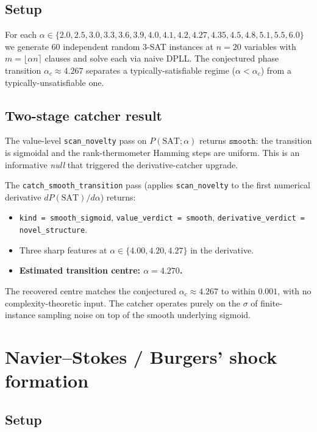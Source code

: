 \documentclass[11pt,letterpaper]{article}
\begin{document}
\subsection{Setup}

For each $\alpha \in \{2.0, 2.5, 3.0, 3.3, 3.6, 3.9, 4.0, 4.1, 4.2, 4.27, 4.35, 4.5, 4.8, 5.1, 5.5, 6.0\}$ we generate 60 independent random 3-SAT instances at $n=20$ variables with $m = \lfloor \alpha n \rceil$ clauses and solve each via naive DPLL. The conjectured phase transition $\alpha_c \approx 4.267$ \cite{satthreshold} separates a typically-satisfiable regime ($\alpha < \alpha_c$) from a typically-unsatisfiable one.

\subsection{Two-stage catcher result}

The value-level \texttt{scan\_novelty} pass on $P(\mathrm{SAT}; \alpha)$ returns $\mathtt{smooth}$: the transition is sigmoidal and the rank-thermometer Hamming steps are uniform. This is an informative \emph{null} that triggered the derivative-catcher upgrade.

The \texttt{catch\_smooth\_transition} pass (applies \texttt{scan\_novelty} to the first numerical derivative $d P(\mathrm{SAT})/d\alpha$) returns:
\begin{itemize}[leftmargin=*,itemsep=0pt]
\item \texttt{kind = smooth\_sigmoid}, \texttt{value\_verdict = smooth}, \texttt{derivative\_verdict = novel\_structure}.
\item Three sharp features at $\alpha \in \{4.00, 4.20, 4.27\}$ in the derivative.
\item \textbf{Estimated transition centre: $\alpha = 4.270$.}
\end{itemize}

The recovered centre matches the conjectured $\alpha_c \approx 4.267$ to within $0.001$, with no complexity-theoretic input. The catcher operates purely on the $\sigma$ of finite-instance sampling noise on top of the smooth underlying sigmoid.

\section{Navier--Stokes / Burgers' shock formation}\label{sec:burgers}

\subsection{Setup}
\end{document}

